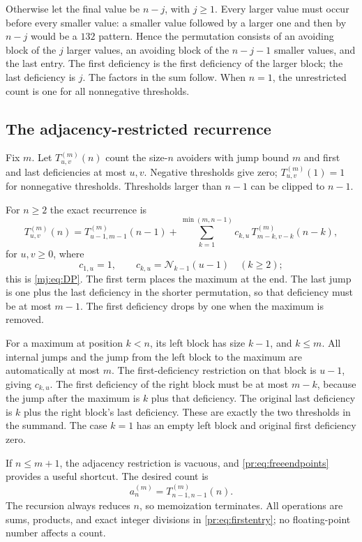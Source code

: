 \documentclass[11pt,a4paper]{article}
\theoremstyle{definition}\newaliascnt{definition}{theorem}
\theoremstyle{remark}\newaliascnt{remark}{theorem}
\begin{document}
Otherwise let the final value be $n-j$, with $j\ge1$. Every larger value must
occur before every smaller value: a smaller value followed by a larger one
and then by $n-j$ would be a $132$ pattern. Hence the permutation consists of
an avoiding block of the $j$ larger values, an avoiding block of the $n-j-1$
smaller values, and the last entry. The first deficiency is the first
deficiency of the larger block; the last deficiency is $j$. The factors in
the sum follow. When $n=1$, the unrestricted count is one for all
nonnegative thresholds.

\subsection{The adjacency-restricted recurrence}
Fix $m$. Let $T^{(m)}_{u,v}(n)$ count the size-$n$ avoiders with jump bound
$m$ and first and last deficiencies at most $u,v$. Negative thresholds give
zero; $T^{(m)}_{u,v}(1)=1$ for nonnegative thresholds. Thresholds larger
than $n-1$ can be clipped to $n-1$.

For $n\ge2$ the exact recurrence is
\begin{equation}
 T^{(m)}_{u,v}(n)=T^{(m)}_{u-1,m-1}(n-1)
 +\sum_{k=1}^{\min(m,n-1)}c_{k,u}\,T^{(m)}_{m-k,v-k}(n-k),
 \label{pr:eq:exactdp}
\end{equation}
for $u,v\ge0$, where
\begin{equation}
 c_{1,u}=1,\qquad c_{k,u}=\mathcal N_{k-1}(u-1)\quad(k\ge2);
 \label{pr:eq:coeffdp}
\end{equation}
this is \eqref{mj:eq:DP}. The first term places the maximum at the end. The
last jump is one plus the last deficiency in the shorter permutation, so
that deficiency must be at most $m-1$. The first deficiency drops by one when
the maximum is removed.

For a maximum at position $k<n$, its left block has size $k-1$, and
$k\le m$. All internal jumps and the jump from the left block to the maximum
are automatically at most $m$. The first-deficiency restriction on that block
is $u-1$, giving $c_{k,u}$. The first deficiency of the right block must be at
most $m-k$, because the jump after the maximum is $k$ plus that deficiency.
The original last deficiency is $k$ plus the right block's last deficiency.
These are exactly the two thresholds in the summand. The case $k=1$ has an
empty left block and original first deficiency zero.

If $n\le m+1$, the adjacency restriction is vacuous, and
\eqref{pr:eq:freeendpoints} provides a useful shortcut. The desired count is
\[
 a_n^{(m)}=T^{(m)}_{n-1,n-1}(n).
\]
The recursion always reduces $n$, so memoization terminates. All operations
are sums, products, and exact integer divisions in \eqref{pr:eq:firstentry};
no floating-point number affects a count.
\end{document}
